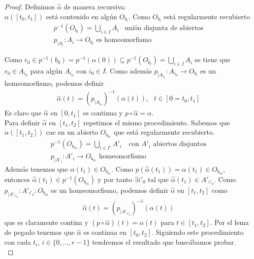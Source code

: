 \begin{lema}
\begin{proof}
        Definimos $\hat{\alpha}$ de manera recursiva:\\

       $ \alpha([t_0,t_1])$ está contenido en algún $O_{b_l}$. Como $O_{b_l}$ está regularmente recubierto
       \begin{gather*}
            p^{-1}(O_{b_l}) = \bigcup\limits_{i\in I} A_i\ \ \text{ unión disjunta de abiertos}\\
            p_{|A_i}: A_i \to O_{b_l} \text{ es homeomorfismo}
       \end{gather*}

       Como $r_0\in p^{-1}(b_0) = p^{-1}(\alpha(0)) \subseteq p^{-1}(O_{b_l}) = \bigcup\limits_{i\in I}A_i$ se tiene que $r_0\in A_{i_0}$ para algún $A_{i_0}$ con $i_0\in I$. Como además $p_{|A_{i_0}}:A_{i_0} \to O_{b_l}$ es un homeomorfismo, podemos definir
       \begin{gather*}
            \hat{\alpha}(t) = (p_{|A_{i_0}})^{-1}(\alpha(t)),\ \ \ t\in [0=t_0, t_1]
       \end{gather*}
       Es claro que $\hat{\alpha}$ en $[0,t_1]$ es continua y $p\circ\hat{\alpha}=\alpha$.\\

       Para definir $\hat{\alpha}$ en $[t_1,t_2]$ repetimos el mismo procedimiento. Sabemos que $\alpha([t_1,t_2])$ cae en un abierto $O_{b_m}$ que está regularmente recubierto.
       \begin{gather*}
            p^{-1}(O_{b_m}) = \bigcup\limits_{i\in I'} A'_i\ \ \ \text{ con $A'_i$ abiertos disjuntos}\\
            p_{|A'_i} : A'_i \to O_{b_m} \text{ homeomorfismo}
       \end{gather*}
       Además tenemos que $\alpha(t_1)\in O_{b_m}$. Como $p(\hat{\alpha}(t_1)) = \alpha(t_1)\in O_{b_m}$, entonces $\hat{\alpha}(t_1)\in p^{-1}(O_{b_m})$ y por tanto $\exists i'_0$ tal que $\hat{\alpha}(t_1)\in A'_{i'_0}$. Como $p_{|A'_{i'_0}}:A'_{i'_0}:O_{b_m}$ es un homeomorfismo, podemos definir $\hat{\alpha}$ en $[t_1,t_2]$ como 
       \begin{gather*}
            \hat{\alpha}(t) = (p_{|A'_{i'_0}})^{-1}(\alpha(t))    
       \end{gather*}
       que es claramente contina y $(p\circ \hat{\alpha})(t)=\alpha(t)$ para $t\in [t_1,t_2]$. Por el lema de pegado tenemos que $\hat{\alpha}$ es continua en $[t_0,t_2]$. Siguiendo este procedimiento con cada $t_i$, $i\in\{0,\dots,r-1\}$ tendremos el resultado que buscábamos probar.\\


\end{proof}
\end{lema}
